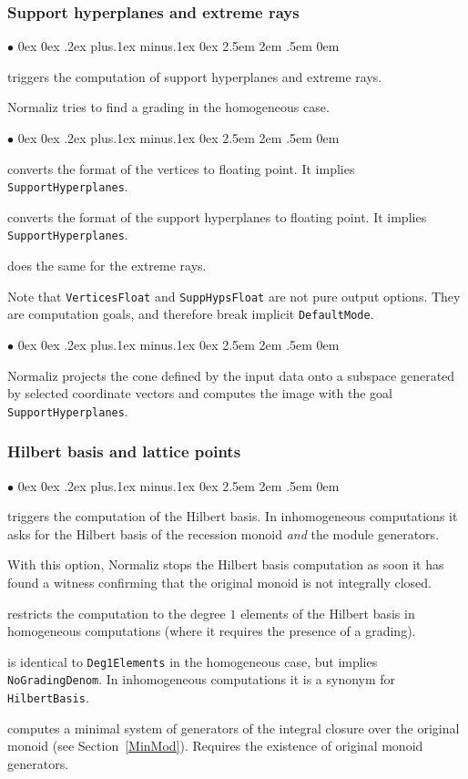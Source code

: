 \documentclass[12pt,a4paper]{scrartcl}
\newcommand{\stdli}{ \topsep0ex \partopsep0ex %
\parsep.2ex plus.1ex minus.1ex \itemsep0ex%
\leftmargin2.5em \labelwidth2em \labelsep.5em \rightmargin0em}%
\renewenvironment{itemize}{\begin{list}{{$\bullet$}}{\stdli}}{\end{list}}
\theoremstyle{definition}
\def\itemtt[#1]{\item[\textbf{\ttt{#1}}]}
\def\ttt{\texttt}
\begin{document}
\subsubsection{Support hyperplanes and extreme rays}

\begin{itemize}
	\itemtt[SupportHyperplanes, -s] triggers the computation of support hyperplanes and extreme rays.
\end{itemize}

Normaliz tries to find a grading in the homogeneous case.

\begin{itemize}
	\itemtt[VerticesFloat] converts the format of the vertices to floating point. It implies \texttt{SupportHyperplanes}.
	\itemtt[SuppHypsFloat] converts the format of the support hyperplanes to floating point. It implies \texttt{SupportHyperplanes}.
	\itemtt[ExtremeRaysFloat] does the same for the extreme rays.
\end{itemize}

Note that \texttt{VerticesFloat} and \texttt{SuppHypsFloat} are not pure output options. They are computation goals, and therefore break implicit \texttt{DefaultMode}.

\begin{itemize}
	\itemtt[ProjectCone] Normaliz projects the cone defined by the input data onto a subspace generated by selected coordinate vectors and computes the image with the goal \verb|SupportHyperplanes|.
\end{itemize}


\subsubsection{Hilbert basis and lattice points}

\begin{itemize}
	
	\itemtt[HilbertBasis, -N] triggers the computation of the Hilbert basis. In inhomogeneous computations it asks for the Hilbert basis of the recession monoid \emph{and} the module generators.
	
	\itemtt [WitnessNotIntegrallyClosed] With this option, Normaliz stops the Hilbert basis computation as soon it has found a witness confirming that the original monoid is not integrally closed.
	
	\itemtt[Deg1Elements, -1] restricts the computation to the degree $1$ elements of the Hilbert basis in homogeneous computations (where it requires the presence of a grading).
	
	\itemtt[LatticePoints] is identical to \verb|Deg1Elements| in the homogeneous case, but implies \verb|NoGradingDenom|. In inhomogeneous computations it is a synonym for \verb|HilbertBasis|.
	
	\itemtt[ModuleGeneratorsOverOriginalMonoid, -M] computes a minimal system of generators of the integral closure over the original monoid (see Section~\ref{MinMod}). Requires the existence of original monoid generators.
\end{itemize}
\end{document}
